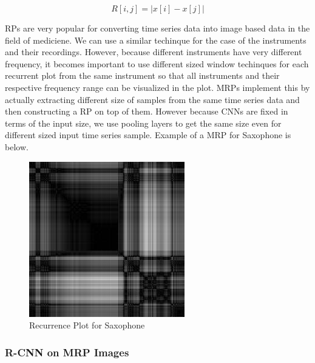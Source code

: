 \documentclass[letterpaper, 10 pt, conference]{ieeeconf}  %
\begin{document}
\begin{equation}
R[i, j] = |{x[i] - x[j]}|
\end{equation}

RPs are very popular for converting time series data into image based data in the field of mediciene. We can use a similar techinque for the case of the instruments and their recordings. However, because different instruments have very different frequency, it becomes important to use different sized window techinques for each recurrent plot from the same instrument so that all instruments and their respective frequency range can be visualized in the plot. MRPs implement this by actually extracting different size of samples from the same time series data and then constructing a RP on top of them. However because CNNs are fixed in terms of the input size, we use pooling layers to get the same size even for different sized input time series sample. Example of a MRP for Saxophone is below.	

\begin{figure}[!h]
\centering
\includegraphics[scale=0.40]{../figs/mrp/sax.jpg}	
\caption{Recurrence Plot for Saxophone}
\label{fig:MRP_Sax} 
\end{figure}


\subsubsection{R-CNN on MRP Images}
\end{document}
